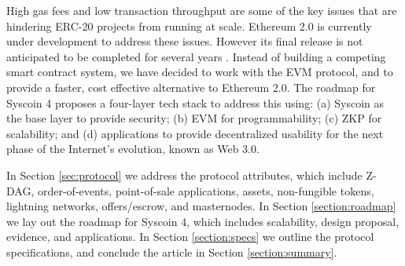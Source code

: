 \documentclass[peerreview]{ieeesyscoin}
\begin{document}
High gas fees and low transaction throughput are some of the key issues that are hindering ERC-20 projects from running at scale. Ethereum 2.0 is currently under development to address these issues. However its final release is not anticipated to be completed for several years \cite{But19}. Instead of building a competing smart contract system, we have decided to work with the EVM protocol, and to provide a faster, cost effective alternative to Ethereum 2.0. The roadmap for Syscoin 4 proposes a four-layer tech stack \cite{Sid21} to address this using: (a) Syscoin as the base layer to provide security; (b) EVM for programmability; (c) ZKP for scalability; and (d) applications to provide decentralized usability for the next phase of the Internet's evolution, known as Web 3.0. 

In Section \ref{sec:protocol} we address the protocol attributes, which include Z-DAG, order-of-events, point-of-sale applications, assets, non-fungible tokens, lightning networks, offers/escrow, and masternodes. In Section \ref{section:roadmap} we lay out the roadmap for Syscoin 4, which includes scalability, design proposal, evidence, and applications. In Section \ref{section:specs} we outline the protocol specifications, and conclude the article in Section \ref{section:summary}.
\end{document}

